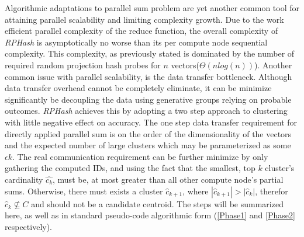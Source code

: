 \documentclass[a4paper,10pt]{article}
\begin{document}
Algorithmic adaptations to parallel sum problem are yet another common
tool for attaining parallel scalability and limiting complexity growth.
Due to the work efficient parallel complexity of the reduce function, the
overall complexity of \emph{RPHash} is asymptotically no worse than its per
compute node sequential complexity.  This complexity, as previously stated
is dominated by the number of required random projection hash probes for $n$
vectors($\Theta(nlog(n))$).  Another common issue with parallel scalability,
is the data transfer bottleneck.  Although data transfer overhead cannot be
completely eliminate, it can be minimize significantly be decoupling the
data using generative groups relying on probable outcomes.  \emph{RPHash}
achieves this by adopting a two step approach to clustering with little
negative effect on accuracy.  The one step data transfer requirement for
directly applied parallel sum is on the order of the dimensionality of the
vectors and the expected number of large clusters which may be parameterized
as some $\epsilon k$.  The real communication requirement can be further
minimize by only gathering the computed IDs, and using the fact that the
smallest, top $k$ cluster's cardinality $\hat{c_{k}}$, must be, at most
greater than all other compute node's partial sums.  Otherwise, there must
exists a cluster $\hat{c}_{k+1}$, where $|\hat{c}_{k+1}| > |\hat{c}_{k}|$,
therefor $\hat{c}_{k}\nsubseteq C$ and should not be a candidate centroid.
The steps will be summarized here, as well as in standard pseudo-code
algorithmic form (\ref{Phase1} and \ref{Phase2} respectively).
\end{document}
